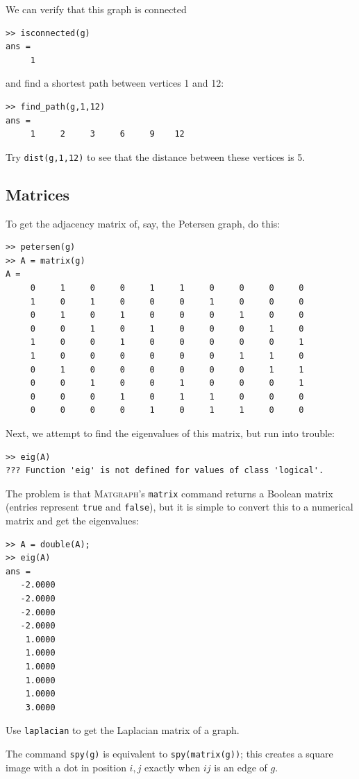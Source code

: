 \documentclass[12pt]{amsart}
\newcommand\matgraph{\textsc{Matgraph}}
\begin{document}
We can verify that this graph is connected
\begin{verbatim}
>> isconnected(g)
ans =
     1
\end{verbatim}
and find a shortest path between vertices 1 and 12:
\begin{verbatim}
>> find_path(g,1,12)
ans =
     1     2     3     6     9    12
\end{verbatim}
Try \verb|dist(g,1,12)| to see that the distance between these
vertices is 5.


\subsection{Matrices}

To get the adjacency matrix of, say, the Petersen graph, do this:
\begin{verbatim}
>> petersen(g)
>> A = matrix(g)
A =
     0     1     0     0     1     1     0     0     0     0
     1     0     1     0     0     0     1     0     0     0
     0     1     0     1     0     0     0     1     0     0
     0     0     1     0     1     0     0     0     1     0
     1     0     0     1     0     0     0     0     0     1
     1     0     0     0     0     0     0     1     1     0
     0     1     0     0     0     0     0     0     1     1
     0     0     1     0     0     1     0     0     0     1
     0     0     0     1     0     1     1     0     0     0
     0     0     0     0     1     0     1     1     0     0
\end{verbatim}
Next, we attempt to find the eigenvalues of this matrix, but run into
trouble:
\begin{verbatim}
>> eig(A)
??? Function 'eig' is not defined for values of class 'logical'.
\end{verbatim}
The problem is that \matgraph's \verb|matrix| command returns a
Boolean matrix (entries represent \texttt{true} and \texttt{false}),
but it is simple to convert this to a numerical matrix and get the
eigenvalues:
\begin{verbatim}
>> A = double(A);
>> eig(A)
ans =
   -2.0000
   -2.0000
   -2.0000
   -2.0000
    1.0000
    1.0000
    1.0000
    1.0000
    1.0000
    3.0000
\end{verbatim}
Use \verb|laplacian| to get the Laplacian matrix of a graph. 

The command \verb|spy(g)| is equivalent to \verb|spy(matrix(g))|; this
creates a square image with a dot in position $i,j$ exactly when $ij$
is an edge of $g$. 
\end{document}
